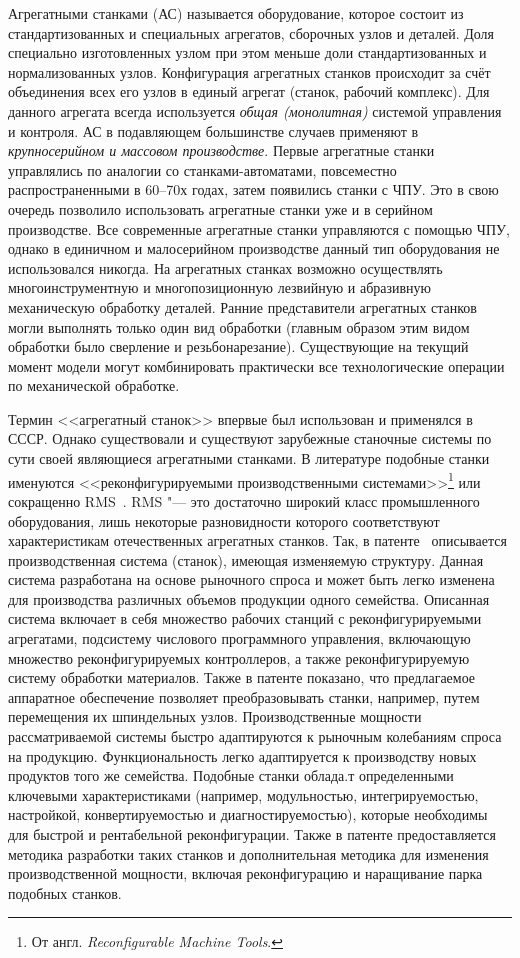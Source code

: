 Агрегатными станками (АС) называется оборудование, которое состоит из стандартизованных и специальных агрегатов, сборочных узлов и деталей. Доля специально изготовленных узлом при этом меньше доли стандартизованных и нормализованных узлов. Конфигурация агрегатных станков происходит за счёт объединения всех его узлов в единый агрегат (станок, рабочий комплекс). Для данного агрегата всегда используется \textit{общая (монолитная)} системой управления и контроля. АС в подавляющем большинстве случаев применяют в \textit{крупносерийном и массовом производстве}. Первые агрегатные станки управлялись по аналогии со станками-автоматами, повсеместно распространенными в 60--70х годах, затем появились станки с ЧПУ. Это в свою очередь позволило использовать агрегатные станки уже и в серийном производстве. Все современные агрегатные станки управляются с помощью ЧПУ, однако в единичном и малосерийном производстве данный тип оборудования не использовался никогда. На агрегатных станках возможно осуществлять многоинструментную и многопозиционную лезвийную и абразивную механическую обработку деталей. Ранние представители агрегатных станков могли выполнять только один вид обработки (главным образом этим видом обработки было сверление и резьбонарезание). Существующие на текущий момент модели могут комбинировать практически все технологические операции по механической обработке.

Термин <<агрегатный станок>> впервые был использован и применялся в СССР. Однако существовали и существуют зарубежные станочные системы по сути своей являющиеся агрегатными станками. В литературе подобные станки именуются <<реконфигурируемыми производственными системами>>\footnote{От англ. \textit{Reconfigurable Machine Tools}.} или сокращенно RMS~\cite{lee1997reconfigurability, mehrabi2000}. RMS "--- это достаточно широкий класс промышленного оборудования, лишь некоторые разновидности которого соответствуют характеристикам отечественных агрегатных станков.  Так, в патенте~\cite{US6349237} описывается производственная система (станок), имеющая изменяемую структуру. Данная система разработана на основе рыночного спроса и может быть легко изменена для производства различных объемов продукции одного семейства. Описанная система включает в себя множество рабочих станций с реконфигурируемыми агрегатами, подсистему числового программного управления, включающую множество реконфигурируемых контроллеров, а также реконфигурируемую систему обработки материалов. Также в патенте показано, что предлагаемое аппаратное обеспечение позволяет преобразовывать станки, например, путем перемещения их шпиндельных узлов. Производственные мощности рассматриваемой системы быстро адаптируются к рыночным колебаниям спроса на продукцию. Функциональность легко адаптируется к производству новых продуктов того же семейства. Подобные станки облада.т определенными ключевыми характеристиками (например, модульностью, интегрируемостью, настройкой, конвертируемостью и диагностируемостью), которые необходимы для быстрой и рентабельной реконфигурации. Также в патенте предоставляется методика разработки таких станков и дополнительная методика для изменения производственной мощности, включая реконфигурацию и наращивание парка подобных станков. 

